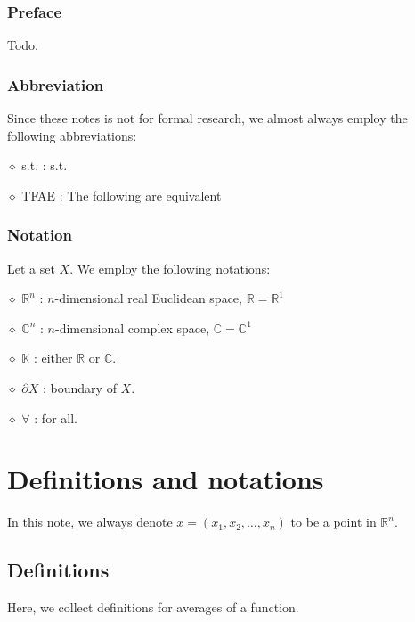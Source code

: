 \documentclass[11pt,a4paper]{report}
\theoremstyle{definition}
\begin{document}
\newpage

\tableofcontents

\newpage

\subsection*{Preface}

Todo.


\subsection*{Abbreviation}

Since these notes is not for formal research, we almost always employ the following abbreviations:

\noindent $\diamond$ s.t. : s.t.

\noindent $\diamond$ TFAE : The following are equivalent


\subsection*{Notation}

Let a set $X$. 
We employ the following notations:

\noindent $\diamond$ $\mathbb{R}^{n}$ : $n$-dimensional real Euclidean space, $\mathbb{R}=\mathbb{R}^{1}$

\noindent $\diamond$ $\mathbb{C}^{n}$ : $n$-dimensional complex space, $\mathbb{C}=\mathbb{C}^{1}$

\noindent $\diamond$ $\mathbb{K}$ : either $\mathbb{R}$ or $\mathbb{C}$.

\noindent $\diamond$ $\partial X$ : boundary of $X$.

\noindent $\diamond$ $\forall$ : for all.

\chapter{Definitions and notations} 

In this note, we always denote $x=(x_1, x_2, \ldots, x_n)$ to be a point in $\mathbb{R}^{n}$.

\section{Definitions}


Here, we collect definitions for averages of a function.
\end{document}
